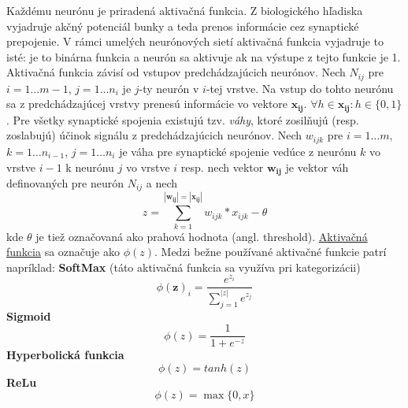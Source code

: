 Každému neurónu je priradená aktivačná funkcia.
Z biologického hľadiska vyjadruje akčný potenciál bunky a teda prenos informácie cez synaptické prepojenie.
V rámci umelých neurónových sietí aktivačná funkcia vyjadruje to isté: je to binárna funkcia a neurón sa aktivuje
ak na výstupe z tejto funkcie je 1.
Aktivačná funkcia závisí od vstupov predchádzajúcich neurónov.
Nech $N_{ij}$ pre $i = 1 \dots m-1$, $j = 1 \dots n_i$ je $j$-ty neurón v $i$-tej vrstve.
Na vstup do tohto neurónu sa z predchádzajúcej vrstvy prenesú informácie vo vektore $\pmb{x_{ij}}$.
$\forall h \in \pmb{x_{ij}} \colon h \in \{0, 1\}$.
Pre všetky synaptické spojenia existujú tzv. \emph{váhy}, ktoré zosilňujú (resp. zoslabujú) účinok signálu z
predchádzajúcich neurónov.
Nech $w_{ijk}$ pre $i=1 \dots m$, $k=1 \dots n_{i-1}$, $j=1 \dots n_i$ je váha pre synaptické spojenie vedúce z
neurónu $k$ vo vrstve $i-1$ k neurónu $j$ vo vrstve $i$ resp.
nech vektor $\pmb{w_{ij}}$ je vektor váh definovaných pre neurón $N_{ij}$ a nech
\begin{equation}
    z = \sum_{k=1}^{|\pmb{w_{ij}}|=|\pmb{x_{ij}}|}{w_{ijk} * x_{ijk}}-\theta
\end{equation}
kde $\theta$ je tiež označovaná ako prahová hodnota (angl. threshold).
\hyperref[figure:activation-functions]{Aktivačná funkcia} sa označuje ako $\phi(z)$.
Medzi bežne používané aktivačné funkcie patrí napríklad:
\linebreak
\textbf{SoftMax} (táto aktivačná funkcia sa využíva pri kategorizácii)
\begin{equation}
    \phi(\mathbf{z})_i = \frac{e^{z_i}}{\sum_{j=1}^{|z|}{e^{z_j}}}
\end{equation}
\textbf{Sigmoid}
\begin{equation}
    \phi(z) = \frac{1}{1+e^{-z}}
\end{equation}
\textbf{Hyperbolická funkcia}
\begin{equation}
    \phi(z) = tanh(z)
\end{equation}
\textbf{ReLu}
\begin{equation}
    \phi(z) = \max\{0, x\}
\end{equation}

